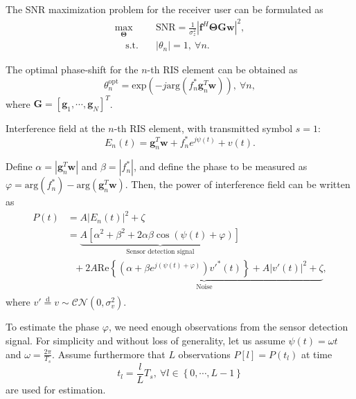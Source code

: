 \documentclass[12pt,draftclsnofoot,journal,onecolumn]{IEEEtran}
\theoremstyle{nonumberplain}
\def \opt {^{\text{opt}}}
\def \opt {^{\text{opt}}}
\def \exp {\text{exp}}
\def \arg {\text{arg}}
\begin{document}
The SNR maximization problem for the receiver user can be formulated as
\begin{subequations}
\label{optimization}
\begin{align}
\label{objective}
\max_{\bm \Theta}~~&\text{SNR}=\frac{1}{\sigma_{z}^{2}}
\left\vert
\bm f^{H}\bm \Theta\bm G\bm w \right\vert^{2},\\
\label{constraint}
~~~~~\text{s.t.~~~}&\left\vert\theta_{n}\right\vert=1,~\forall n.
\end{align}
\end{subequations}

The optimal phase-shift for the $n$-th RIS element can be obtained as
\begin{equation}
\label{optimal RIS}
\theta_{n}\opt = \exp\left(-j\arg\left(f_{n}^{*}\bm g_{n}^{T}\bm w\right)\right),~\forall n,
\end{equation}
where $\bm G = \left[\bm g_{1}, \cdots, \bm g_{N}\right]^{T}$.

Interference field at the $n$-th RIS element, with transmitted symbol $s=1$:
\begin{equation}
\label{interference}
E_{n}(t)=\bm g_{n}^{T}\bm w+f_{n}^{*}e^{j\psi (t)}+v(t).
\end{equation}

Define $\alpha = \left\vert\bm g_{n}^{T}\bm w\right\vert$ and $\beta = \left\vert f_{n}^{*}\right \vert$, and define the phase to be measured as $\varphi = \arg\left(f_{n}^{*}\right)-\arg\left(\bm g_{n}^{T}\bm w\right)$.
Then, the power of interference field can be written as
\begin{equation}
\label{Power of Interference}
\begin{aligned}
P(t)&=A \left| E_{n} (t)\right |^{2}+\zeta\\
&=\underbrace{A\left[\alpha^{2}+\beta^{2}+2\alpha\beta\cos\left(\psi(t)+\varphi\right)\right]}_{\text{Sensor detection signal}}\\
&~~~+\underbrace{2A\text{Re}\left\{\left(\alpha+\beta e^{j\left(\psi(t)+\varphi\right)}\right)v'^{*}(t)\right\}+A\left|v'(t)\right|^{2}+\zeta}_{\text{Noise}},\\
\end{aligned}
\end{equation}
where $v'\overset{\text{d}}{=}v\sim\mathcal{CN}\left(0,\sigma_{v}^{2}\right)$.

To estimate the phase $\varphi$, we need enough observations from the sensor detection signal. For simplicity and without loss of generality, let us assume $\psi(t)=\omega t$ and $\omega=\frac{2\pi}{T_{s}}$. Assume furthermore that $L$ observations $P[l]=P(t_{l})$ at time 
\begin{equation}
\label{observation time}
t_{l}=\frac{l}{L}T_{s},~\forall l\in \left\{0,\cdots ,L-1\right\}
\end{equation}
are used for estimation.
\end{document}
